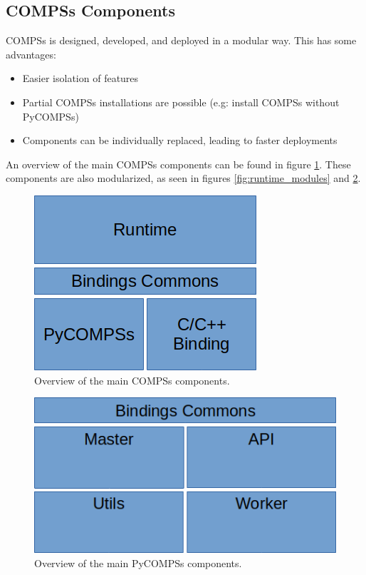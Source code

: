 \subsection{COMPSs Components}
\label{subsec:compss_components}
COMPSs is designed, developed, and deployed in a modular way. This has some advantages:
\begin{itemize} 
\item Easier isolation of features
\item Partial COMPSs installations are possible (e.g: install COMPSs without PyCOMPSs)
\item Components can be individually replaced, leading to faster deployments
\end{itemize}
An overview of the main COMPSs components can be found in figure \ref{fig:compss_modules}. These components are also modularized, as seen in figures \ref{fig:runtime_modules} and \ref{fig:pycompss_modules}.
\begin{figure}
\centering
\includegraphics{figures/compss_modules.png}
\caption{Overview of the main COMPSs components.}
\label{fig:compss_modules}
\end{figure}

\begin{figure}
\centering
\includegraphics{figures/pycompss_modules.png}
\caption{Overview of the main PyCOMPSs components.}
\label{fig:pycompss_modules}
\end{figure}

